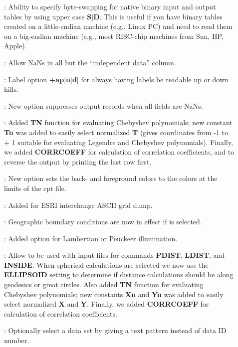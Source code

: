 \begin{description}
\item []: Ability to specify byte-swapping for native binary input and output tables by using upper
case \textbf{S}$|$\textbf{D}.  This is useful if you have binary tables created on a little-endian machine (e.g.,
Linux PC) and need to read them on a big-endian machine (e.g., most RISC-chip machines from Sun, HP, Apple).
\item []: Allow NaNs in all but the ``independent data'' column.
\item []: Label option \textbf{+ap}[\textbf{u}$|$\textbf{d}] for always having labels be readable up or down hills.
\item []: New  option suppresses output records when all fields are NaNs.
\item []: Added \textbf{TN} function
for evaluating Chebyshev polynomials; new constant \textbf{Tn} was added to easily select normalized \textbf{T}
(gives coordinates from -1 to + 1 suitable for evaluating Legendre and Chebyshev polynomials).
Finally, we added \textbf{CORRCOEFF} for calculation of correlation coefficients, and  to reverse
the output by printing the last row first.
\item []: New option  sets the back- and foreground colors to the colors at the limits of the cpt file.
\item []: Added  for ESRI interchange ASCII grid dump.
\item []: Geographic boundary conditions are now in effect if  is selected.
\item []: Added option  for Lambertian or Peuckeer illumination.
\item []: Allow  to be used with input files for commands \textbf{PDIST}, \textbf{LDIST},
and \textbf{INSIDE}.  When spherical calculations are selected we now use the \textbf{ELLIPSOID} setting to
determine if distance calculations should be along geodesics or great circles.  Also added \textbf{TN} function
for evaluating Chebyshev polynomials; new constants \textbf{Xn} and \textbf{Yn} was added to easily select
normalized \textbf{X} and \textbf{Y}.  Finally, we added \textbf{CORRCOEFF} for calculation of correlation coefficients.
\item []: Optionally select a data set by giving a text pattern instead of data ID number.

\end{description}
